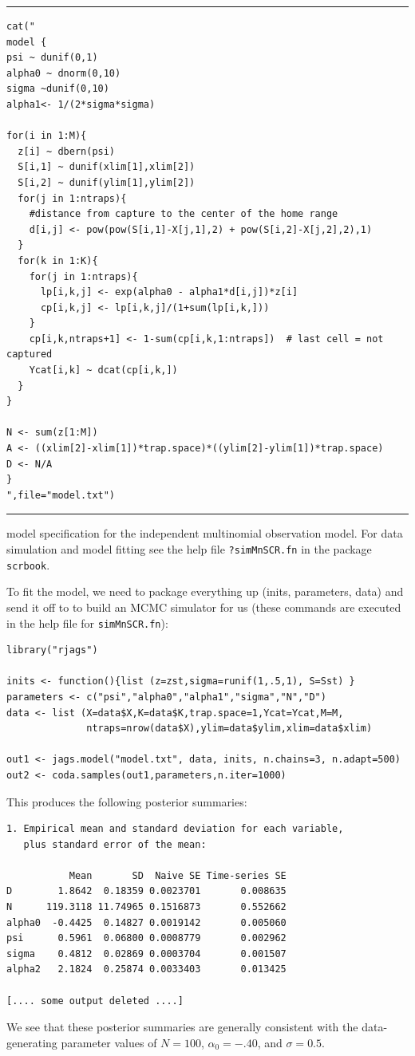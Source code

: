 \begin{panel}[htp]
\centering
\rule[0.15in]{\textwidth}{.03in}
{\small
\begin{verbatim}
cat("
model {
psi ~ dunif(0,1)
alpha0 ~ dnorm(0,10)
sigma ~dunif(0,10)
alpha1<- 1/(2*sigma*sigma)

for(i in 1:M){
  z[i] ~ dbern(psi)
  S[i,1] ~ dunif(xlim[1],xlim[2])
  S[i,2] ~ dunif(ylim[1],ylim[2])
  for(j in 1:ntraps){
    #distance from capture to the center of the home range
    d[i,j] <- pow(pow(S[i,1]-X[j,1],2) + pow(S[i,2]-X[j,2],2),1)
  }
  for(k in 1:K){
    for(j in 1:ntraps){
      lp[i,k,j] <- exp(alpha0 - alpha1*d[i,j])*z[i]            
      cp[i,k,j] <- lp[i,k,j]/(1+sum(lp[i,k,]))
    }
    cp[i,k,ntraps+1] <- 1-sum(cp[i,k,1:ntraps])  # last cell = not captured
    Ycat[i,k] ~ dcat(cp[i,k,])
  }  
}   

N <- sum(z[1:M]) 
A <- ((xlim[2]-xlim[1])*trap.space)*((ylim[2]-ylim[1])*trap.space)
D <- N/A
}
",file="model.txt")

\end{verbatim}
}
\rule[-0.15in]{\textwidth}{.03in}
\caption{
\winbugs model specification for the independent multinomial
observation model. For data simulation and model fitting see the
help file \mbox{\tt ?simMnSCR.fn} in the \R package \mbox{\tt scrbook}.
}
\label{poisson-mn.panel.mn}
\end{panel}

To fit the model, we need to package everything up (inits, parameters, data) and send
it off to \jags to build an MCMC simulator for us (these commands are
executed in the help file for \mbox{\tt simMnSCR.fn}):
{\small
\begin{verbatim}
library("rjags")

inits <- function(){list (z=zst,sigma=runif(1,.5,1), S=Sst) }              
parameters <- c("psi","alpha0","alpha1","sigma","N","D")
data <- list (X=data$X,K=data$K,trap.space=1,Ycat=Ycat,M=M,
              ntraps=nrow(data$X),ylim=data$ylim,xlim=data$xlim)         

out1 <- jags.model("model.txt", data, inits, n.chains=3, n.adapt=500)
out2 <- coda.samples(out1,parameters,n.iter=1000)
\end{verbatim}
}
This produces the following posterior summaries:
{\small
\begin{verbatim}
1. Empirical mean and standard deviation for each variable,
   plus standard error of the mean:

           Mean       SD  Naive SE Time-series SE
D        1.8642  0.18359 0.0023701       0.008635
N      119.3118 11.74965 0.1516873       0.552662
alpha0  -0.4425  0.14827 0.0019142       0.005060
psi      0.5961  0.06800 0.0008779       0.002962
sigma    0.4812  0.02869 0.0003704       0.001507
alpha2   2.1824  0.25874 0.0033403       0.013425

[.... some output deleted ....]
\end{verbatim}
}
We see that these posterior summaries are generally 
consistent with the data-generating parameter values of  
$N=100$, $\alpha_{0}= -.40$, and $\sigma=0.5$.

